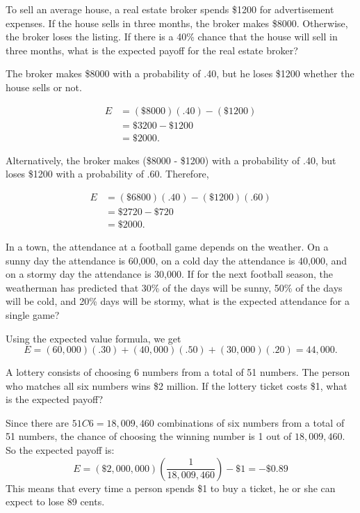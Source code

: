 \begin{example}
    To sell an average house, a real estate broker spends \$1200 for advertisement expenses. If the house sells in three months, the broker makes \$8000. Otherwise, the broker loses the listing. If there is a 40\% chance that the house will sell in three months, what is the expected payoff for the real estate broker?
\end{example}

\begin{solution}
    The broker makes \$8000 with a probability of .40, but he loses \$1200 whether the house sells or not.

    \begin{align*}
        E & = (\$8000)(.40) - (\$1200) \\
          & = \$3200 - \$1200          \\
          & = \$2000.
    \end{align*}

    Alternatively, the broker makes (\$8000 - \$1200) with a probability of .40, but loses \$1200 with a probability of .60. Therefore,

    \begin{align*}
        E & = (\$6800)(.40) - (\$1200)(.60) \\
          & = \$2720 - \$720                \\
          & = \$2000.
    \end{align*}
\end{solution}

\begin{example}
    In a town, the attendance at a football game depends on the weather. On a sunny day the attendance is 60,000, on a cold day the attendance is 40,000, and on a stormy day the attendance is 30,000. If for the next football season, the weatherman has predicted that 30\% of the days will be sunny, 50\% of the days will be cold, and 20\% days will be stormy, what is the expected attendance for a single game?
\end{example}

\begin{solution}
    Using the expected value formula, we get
    \[ E = (60,000)(.30) + (40,000)(.50) + (30,000)(.20) = 44,000. \]
\end{solution}

\begin{example}
    A lottery consists of choosing 6 numbers from a total of 51 numbers. The person who matches all six numbers wins \$2 million. If the lottery ticket costs \$1, what is the expected payoff?
\end{example}

\begin{solution}
    Since there are \( 51C6 = 18,009,460 \) combinations of six numbers from a total of 51 numbers, the chance of choosing the winning number is 1 out of $18,009,460$.
    So the expected payoff is:
    \[ E = (\$2,000,000)\left( \frac{1}{18,009,460} \right) - \$1 = -\$0.89 \]
    This means that every time a person spends \$1 to buy a ticket, he or she can expect to lose 89 cents.
\end{solution}